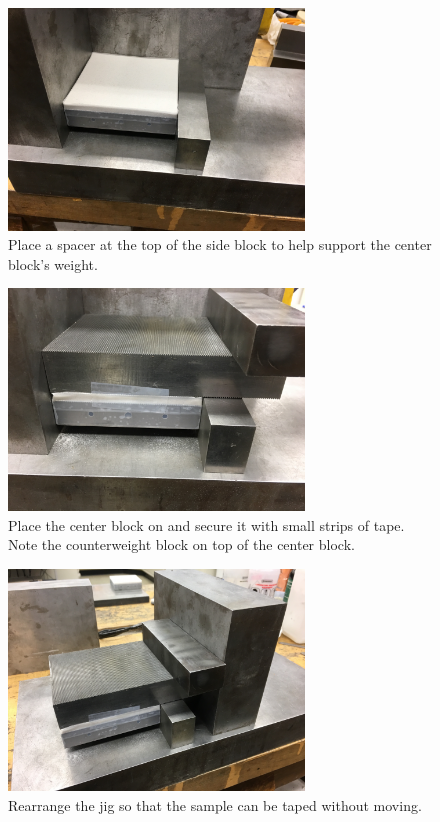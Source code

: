 \clearpage

\begin{figure}
	\centering
        \includegraphics[width=0.7\textwidth]{appendix_sample_prep/dds_sideblock_jig_2.jpg}
   	\caption{Place a spacer at the top of the side block to help support the center block's weight.}
  	\label{Fig:dds_sideblock_jig_2}
\end{figure}

\begin{figure}
	\centering
        \includegraphics[width=0.7\textwidth]{appendix_sample_prep/dds_centerblock_jig.jpg}
   	\caption{Place the center block on and secure it with small strips of tape. Note the counterweight block on top of the center block.}
  	\label{Fig:dds_centerblock_jig}
\end{figure}

\begin{figure}
	\centering
        \includegraphics[width=0.7\textwidth]{appendix_sample_prep/dds_move_block.jpg}
   	\caption{Rearrange the jig so that the sample can be taped without moving.}
  	\label{Fig:dds_move_block}
\end{figure}

